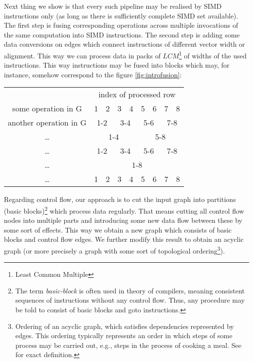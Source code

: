   
Next thing we show is that every such pipeline may be realised by SIMD instructions only (as long as there is sufficiently complete SIMD set available). The first step is fusing corresponding operations across multiple invocations of the same computation into SIMD instructions. The second step is adding some data conversions on edges which connect instructions of different vector width or alignment. This way we can process data in packs of $LCM$\footnote{Least Common Multiple} of widths of the used instructions. This way instructions may be fused into blocks which may, for instance, somehow correspond to the figure \ref{fig:introfusion}:

\mybeginfig
\begin{center}
  \begin{tabular}{c|c|c|c|c|c|c|c|c|}
    \cline{2-9}
    & \multicolumn{8}{c|}{index of processed row}\\
    \cline{2-9}
    some operation in G & 1 & 2 & 3 & 4 & 5 & 6 & 7 & 8 \\
    \cline{2-9}
    another operation in G & \multicolumn{2}{c|}{1-2} & \multicolumn{2}{c|}{3-4} & \multicolumn{2}{c|}{5-6} & \multicolumn{2}{c|}{7-8} \\
    \cline{2-9}
    \dots & \multicolumn{4}{c|}{1-4} & \multicolumn{4}{c|}{5-8}\\
    \cline{2-9}
    \dots & \multicolumn{2}{c|}{1-2} & \multicolumn{2}{c|}{3-4} & \multicolumn{2}{c|}{5-6} & \multicolumn{2}{c|}{7-8}\\
    \cline{2-9}
    \dots & \multicolumn{8}{c|}{1-8} \\
    \cline{2-9}
    \dots & 1 & 2 & 3 & 4 & 5 & 6 & 7 & 8\\
    \cline{2-9}
  \end{tabular}
\end{center}


  Regarding control flow, our approach is to cut the input graph into partitions (basic blocks)\footnote{The term \emph{basic-block} is often used in theory of compilers, meaning consistent sequences of instructions without any control flow. Thus, any procedure may be told to consist of basic blocks and goto instructions.} which process data regularly. That means cutting all control flow nodes into multiple parts and introducing some new data flow between these by some sort of effects. This way we obtain a new graph which consists of basic blocks and control flow edges. We further modify this result to obtain an acyclic graph (or more precisely a graph with some sort of topological ordering\footnote{Ordering of an acyclic graph, which satisfies dependencies represented by edges. This ordering typically represents an order in which steps of some process may be carried out, e.g., steps in the process of cooking a meal. See \cite{kapitoly} for exact definition.}). 

